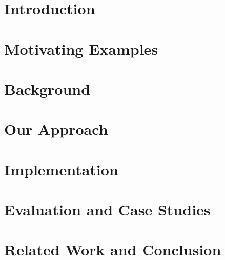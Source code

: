 \documentclass[runningheads]{llncs}
\begin{document}
\section{Introduction}
\label{s1}


\section{Motivating Examples}
\label{s2}

\section{Background}
\label{s03}

\section{Our Approach}
\label{s3}


\section{Implementation}
\label{s4}


\section{Evaluation and Case Studies}
\label{s5}

\section{Related Work and Conclusion}



\end{document}
